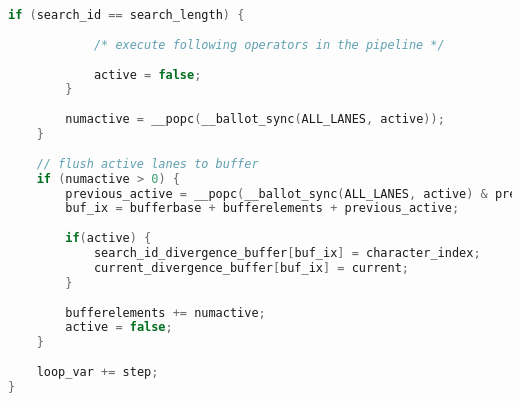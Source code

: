\begin{lstlisting}[language=C++,
caption=Umsetzung der String-Selektion mit Lane Refill]
		if (search_id == search_length) {
		
			/* execute following operators in the pipeline */
		
			active = false;
		}
		
		numactive = __popc(__ballot_sync(ALL_LANES, active));
	}
	
	// flush active lanes to buffer
	if (numactive > 0) {
		previous_active = __popc(__ballot_sync(ALL_LANES, active) & prefixlanes);
		buf_ix = bufferbase + bufferelements + previous_active;
		
		if(active) {
			search_id_divergence_buffer[buf_ix] = character_index;
			current_divergence_buffer[buf_ix] = current;
		}
		
		bufferelements += numactive;
		active = false;
	}
	
	loop_var += step;
}
\end{lstlisting}
